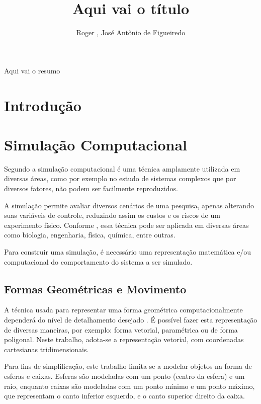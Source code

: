 \documentclass[12pt]{article}
\title{Aqui vai o título}
\author{Roger \inst{1}, José Antônio de Figueiredo\inst{1}}
\begin{document}
 

\maketitle

\begin{abstract}
\end{abstract}
     
\begin{resumo} 
  Aqui vai o resumo
\end{resumo}

\section{Introdução}

\section{Simulação Computacional}

Segundo \cite{duran2018computer} a simulação computacional é uma técnica amplamente utilizada em diversas áreas, como por exemplo no estudo de sistemas complexos que por diversos fatores, não podem ser facilmente reproduzidos.

A simulação permite avaliar diversos cenários de uma pesquisa, apenas alterando suas variáveis de controle, reduzindo assim os custos e os riscos de um experimento físico. Conforme \cite{marschner2018}, essa técnica pode ser aplicada em diversas áreas como biologia, engenharia, física, química, entre outras.

Para construir uma simulação, é necessário uma representação matemática e/ou computacional do comportamento do sistema a ser simulado.

\subsection{Formas Geométricas e Movimento}
A técnica usada para representar uma forma geométrica computacionalmente dependerá do nível de detalhamento desejado \cite{pharr2016}. É possível fazer esta representação de diversas maneiras, por exemplo: forma vetorial, paramétrica ou de forma poligonal. Neste trabalho, adota-se a representação vetorial, com coordenadas cartesianas tridimensionais.

Para fins de simplificação, este trabalho limita-se a modelar objetos na forma de esferas e caixas. Esferas são modeladas com um ponto (centro da esfera) e um raio, enquanto caixas são modeladas com um ponto mínimo e um ponto máximo, que representam o canto inferior esquerdo, e o canto superior direito da caixa.
\end{document}
